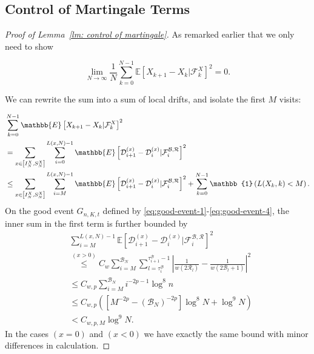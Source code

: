 \documentclass[EJP]{ejpecp} %
\begin{document}
\subsection{Control of Martingale Terms } 
\begin{proof}[Proof of Lemma~\ref{lm: control of martingale}]
	As remarked earlier that we only need to show
	
	\[
	\lim_{N \to \infty } \frac{1}{N} \sum_{k = 0}^{N-1} \mathbb{E}\left[ X_{k+1} - X_k | \mathcal{F}_k^X \right]^2 = 0
	.\] 
	
	
	We can rewrite the sum into a sum of local drifts, and isolate the first $M$ visits:
	
	\begin{align}
		&\sum_{k = 0}^{N-1} \mathbb{E}\left[ X_{k+1} - X_k | \mathcal{F}_k^X \right]^2
		\notag
		\\
		&= \sum_{x \in \left[ I_N^X, S_N^X \right]} \sum_{i = 0}^{L(x, N) - 1} \mathbb{E}\left[ \mathcal{D}_{i+1}^{(x)} - \mathcal{D}_i^{(x)} | \mathcal{F}_{i}^{\mathcal{B}, \mathcal{R}} \right]^2  
		\notag
		\\
		&\le  \sum_{x \in \left[ I_N^X, S_N^X \right]} \sum_{i = M}^{L(x,N) - 1} \mathbb{E}\left[ \mathcal{D}_{i+1}^{(x)} - \mathcal{D}_i^{(x)} | \mathcal{F}_{i}^{\mathcal{B}, \mathcal{R}} \right]^2  + 
		\sum_{k = 0}^{N - 1} \mathbb{1}\left( L(X_k, k) <  M \right) 
		\label{eq:lem-martingale-1}
		.\end{align}
	On the good event $G_{n, K, t}$ defined by \eqref{eq:good-event-1}-\eqref{eq:good-event-4},
	the inner sum in the first term is further bounded by
	\begin{align*}
		&\sum_{i =M}^{ L(x, N) - 1} \mathbb{E}\left[ \mathcal{D}_{i+1}^{(x)} - \mathcal{D}_i^{(x)} | \mathcal{F}_{i}^{\mathcal{B}, \mathcal{R}} \right]^2\\
		&\stackrel{(x > 0)}{\le} C_w \sum_{i = M}^{\mathcal{B}_N} \sum_{l = \tau_i^{\mathcal{B}}}^{\tau_{i+1}^{\mathcal{B}}-1} 
		\left| \frac{1}{w(2 \mathcal{R}_l)} - \frac{1}{w\left( 2 \mathcal{B}_l + 1 \right) } \right|^2 \\
		&\le C_{w, p} \sum_{i = M}^{\mathcal{B}_N} i^{- 2 p - 1} \log^8 n  \\
		&\le C_{w, p} \left(\left[ M^{- 2 p} -\left(  \mathcal{B}_N \right) ^{- 2 p} \right] \log^8 N + \log^9 N\right)  \\
		&< C_{w, p, M} \log^9 N
		.
	\end{align*}
	In the cases $(x=0)$ and $(x < 0)$ we have exactly the same bound with minor differences in calculation.
	

\end{proof}
\end{document}
